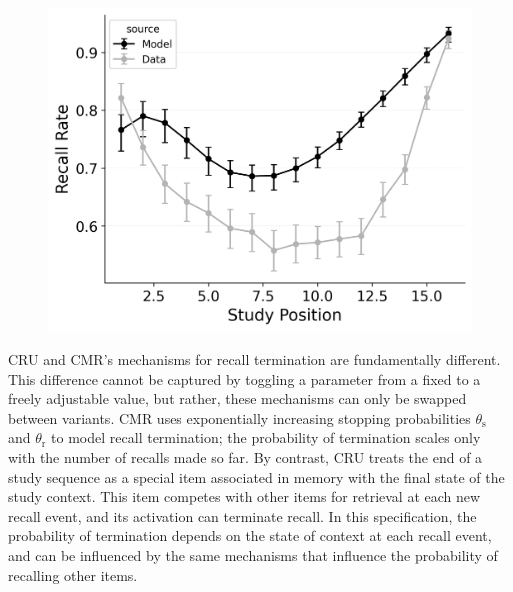 \documentclass[
  man,
  floatsintext,
  longtable,
  nolmodern,
  notxfonts,
  notimes,
  draftfirst,
  colorlinks=true,linkcolor=blue,citecolor=blue,urlcolor=blue]{apa7}
\begin{document}
\begin{figure}
%
\begin{minipage}{0.33\linewidth}
\includegraphics{figures/bw_HealeyKahana2014_CRU_with_Feature-to-Context__Pre-Expt__Primacy_StartDrift__and_ContextTerm_Fitting_spc.png}\end{minipage}%

\end{figure}%

CRU and CMR's mechanisms for recall termination are fundamentally
different. This difference cannot be captured by toggling a parameter
from a fixed to a freely adjustable value, but rather, these mechanisms
can only be swapped between variants. CMR uses exponentially increasing
stopping probabilities \(\theta_\text{s}\) and \(\theta_\text{r}\) to
model recall termination; the probability of termination scales only
with the number of recalls made so far. By contrast, CRU treats the end
of a study sequence as a special item associated in memory with the
final state of the study context. This item competes with other items
for retrieval at each new recall event, and its activation can terminate
recall. In this specification, the probability of termination depends on
the state of context at each recall event, and can be influenced by the
same mechanisms that influence the probability of recalling other items.
\end{document}
